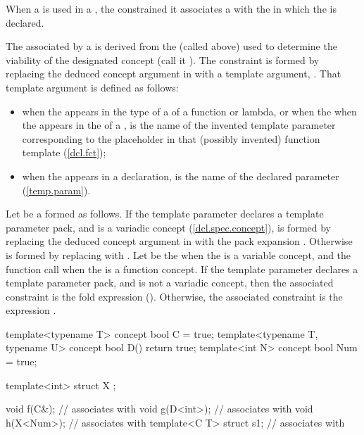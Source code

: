 When a 
is used in a ,
the constrained it associates a 
 with the
 in which the
 is declared.


\pnum
The  
associated by a 
is derived from the  
(called  above) used to determine the viability of
the designated concept (call it ).
% 
The constraint is formed by replacing the
deduced concept argument  in  with a 
template argument, . That template argument is
defined as follows:
% 
\begin{itemize}
\item when the 
appears in the type of a 
of a function or lambda, 
% 
or when the when the 
appears in the 
of a ,
% 
 is the name of the
invented template parameter corresponding to the 
placeholder in that (possibly invented) function template 
(\ref{dcl.fct});

\item when the 
appears in a 
declaration,  is the name of the declared
parameter (\ref{temp.param}). 
\end{itemize}
% 
Let  be a 
formed as follows. 
% 
If the template parameter  declares a template parameter 
pack, and  is a variadic concept 
(\ref{dcl.spec.concept}),
 is formed by replacing the deduced concept
argument  in 
 with the pack expansion .
% 
Otherwise  is formed by replacing 
with .
% 
Let  be the 
 when the  is a variable concept, and
the function call  when the  is a 
function concept.
% 
If the template parameter  declares a template
parameter pack, and  is not a variadic concept,
then the associated constraint is the fold expression 
().
% 
Otherwise, the associated constraint is the expression .
% 
\enterexample
\begin{codeblock}
template<typename T> concept bool C = true;
template<typename T, typename U> concept bool D() { return true; }
template<int N> concept bool Num = true;

template<int> struct X { };

void f(C&);              // associates  with 
void g(D<int>);          // associates  with 
void h(X<Num>);          // associates  with 
template<C T> struct s1; // associates  with 
\end{codeblock}
